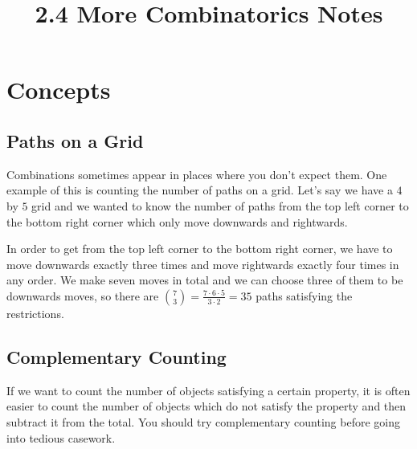 \documentclass[twocolumn]{article}
\title{2.4 More Combinatorics Notes}
\author{}
\date{}
\begin{document}
\maketitle

\section*{Concepts}

\subsection*{Paths on a Grid}
Combinations sometimes appear in places where you don't expect them. One example 
of this is counting the number of paths on a grid. Let's say we have a $4$ by 
$5$ grid and we wanted to know the number of paths from the top left corner to 
the bottom right corner which only move downwards and rightwards.
\begin{center}
\end{center}
In order to get from the top left corner to the bottom right corner, we have to 
move downwards exactly three times and move rightwards exactly four times in any 
order. We make seven moves in total and we can choose three of them to be 
downwards moves, so there are $\binom{7}{3} = \frac{7 \cdot 6 \cdot 5}{3 \cdot 
2} = 35$ paths satisfying the restrictions.

\subsection*{Complementary Counting}
If we want to count the number of objects satisfying a certain property, it is 
often easier to count the number of objects which do not satisfy the property 
and then subtract it from the total. You should try complementary counting 
before going into tedious casework.
\end{document}
